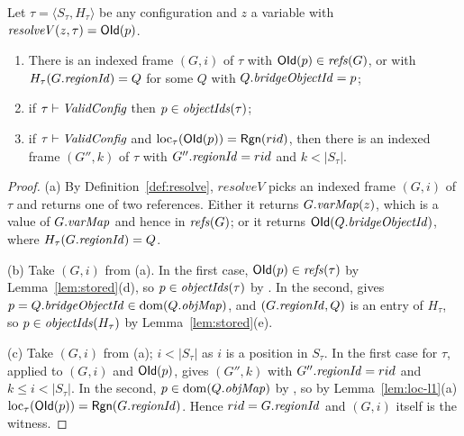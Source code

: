 \begin{lemma}
\label{lem:fieldAsgn-resolve}
Let $\tau = \langle S_\tau, H_\tau\rangle$ be any configuration and $z$ a variable with
$\mathit{resolveV}(z, \tau) = \mathsf{OId}(p)$.
\begin{enumerate}[nosep,label=(\alph*)]
  \item There is an indexed frame $(G, i)$ of $\tau$ with $\mathsf{OId}(p) \in \mathit{refs}(G)$, or with
    $H_\tau(G.\mathit{regionId}) = Q$ for some $Q$ with $Q.\mathit{bridgeObjectId} = p$;
  \item if $\tau \vdash \textit{ValidConfig}$ then $p \in \mathit{objectIds}(\tau)$;
  \item if $\tau \vdash \textit{ValidConfig}$ and $\mathrm{loc}_{\tau}(\mathsf{OId}(p)) = \mathsf{Rgn}(rid)$, then there is an
    indexed frame $(G'', k)$ of $\tau$ with $G''.\mathit{regionId} = rid$ and $k < |S_\tau|$.
\end{enumerate}
\end{lemma}
\begin{proof}
(a) By Definition~\ref{def:resolve}, $\mathit{resolveV}$ picks an indexed frame $(G, i)$ of $\tau$ and
returns one of two references. Either it returns $G.\mathit{varMap}(z)$, which is a value of $G.\mathit{varMap}$ and hence
in $\mathit{refs}(G)$; or it returns $\mathsf{OId}(Q.\mathit{bridgeObjectId})$, where $H_\tau(G.\mathit{regionId}) = Q$.

(b) Take $(G, i)$ from (a). In the first case, $\mathsf{OId}(p) \in \mathit{refs}(\tau)$ by
Lemma~\ref{lem:stored}(d), so $p \in \mathit{objectIds}(\tau)$ by . In the second,  gives
$p = Q.\mathit{bridgeObjectId} \in \mathrm{dom}(Q.\mathit{objMap})$, and $(G.\mathit{regionId}, Q)$ is an entry of $H_\tau$, so $p \in \mathit{objectIds}(H_\tau)$
by Lemma~\ref{lem:stored}(e).

(c) Take $(G, i)$ from (a); $i < |S_\tau|$ as $i$ is a position in $S_\tau$. In the first case 
for $\tau$, applied to $(G, i)$ and $\mathsf{OId}(p)$, gives $(G'', k)$ with $G''.\mathit{regionId} = rid$ and
$k \le i < |S_\tau|$. In the second, $p \in \mathrm{dom}(Q.\mathit{objMap})$ by , so by
Lemma~\ref{lem:loc-l1}(a) $\mathrm{loc}_{\tau}(\mathsf{OId}(p)) = \mathsf{Rgn}(G.\mathit{regionId})$. Hence $rid = G.\mathit{regionId}$ and $(G, i)$
itself is the witness.
\end{proof}

